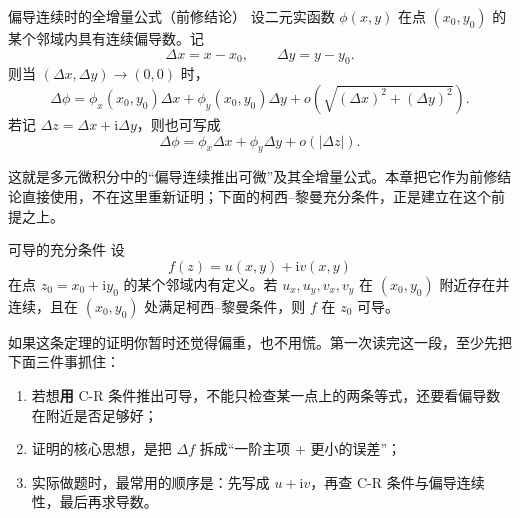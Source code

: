 \begin{yinli}{偏导连续时的全增量公式（前修结论）}{}
设二元实函数 $\phi(x,y)$ 在点 $(x_0,y_0)$ 的某个邻域内具有连续偏导数。记
\[
    \Delta x=x-x_0,\qquad \Delta y=y-y_0.
\]
则当 $(\Delta x,\Delta y)\to (0,0)$ 时，
\[
    \Delta\phi
    =\phi_x(x_0,y_0)\Delta x+\phi_y(x_0,y_0)\Delta y
    +o\!\left(\sqrt{(\Delta x)^2+(\Delta y)^2}\right).
\]
若记 $\Delta z=\Delta x+\mathrm{i}\Delta y$，则也可写成
\[
    \Delta\phi
    =\phi_x\Delta x+\phi_y\Delta y+o(|\Delta z|).
\]
\end{yinli}

\begin{zhu}{}{}
这就是多元微积分中的``偏导连续推出可微''及其全增量公式。本章把它作为前修结论直接使用，不在这里重新证明；下面的柯西--黎曼充分条件，正是建立在这个前提之上。
\end{zhu}

\begin{dingli}{可导的充分条件}{}\label{thm:ch02-cr-sufficient}
设
\[
    f(z)=u(x,y)+\mathrm{i}v(x,y)
\]
在点 $z_0=x_0+\mathrm{i}y_0$ 的某个邻域内有定义。若 $u_x,u_y,v_x,v_y$ 在 $(x_0,y_0)$ 附近存在并连续，且在 $(x_0,y_0)$ 处满足柯西--黎曼条件，则 $f$ 在 $z_0$ 可导。
\end{dingli}

\begin{tishi}
如果这条定理的证明你暂时还觉得偏重，也不用慌。第一次读完这一段，至少先把下面三件事抓住：
\begin{enumerate}
    \item 若想\textbf{用} C-R 条件推出可导，不能只检查某一点上的两条等式，还要看偏导数在附近是否足够好；
    \item 证明的核心思想，是把 $\Delta f$ 拆成``一阶主项 + 更小的误差''；
    \item 实际做题时，最常用的顺序是：先写成 $u+\mathrm{i}v$，再查 C-R 条件与偏导连续性，最后再求导数。
\end{enumerate}
\end{tishi}

